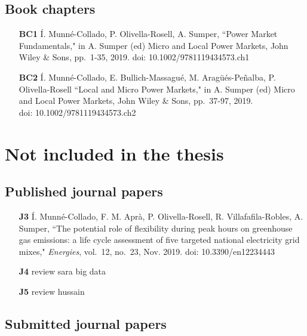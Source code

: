 \subsection*{Book chapters}

\begin{itemize}
	
	\item [\textbf{BC1}] \'{I}. Munn\'{e}-Collado, P. Olivella-Rosell, A. Sumper, ``Power Market Fundamentals," in A. Sumper (ed) Micro and Local Power Markets, John Wiley \& Sons, pp.~1-35, 2019. doi: 10.1002/9781119434573.ch1
	
	\item [\textbf{BC2}] \'{I}. Munn\'{e}-Collado, E. Bullich-Massagu\'{e}, M. Arag\"{u}\'{e}s-Pe\~{n}alba, P. Olivella-Rosell ``Local and Micro Power Markets," in A. Sumper (ed) Micro and Local Power Markets, John Wiley \& Sons, pp.~37-97, 2019. \\doi: 10.1002/9781119434573.ch2

	
\end{itemize}

\section*{Not included in the thesis}

\subsection*{Published journal papers}

\begin{itemize}
	
	\item[\textbf{J3}] \'{I}. Munn\'{e}-Collado, F. M. Apr\`{a}, P. Olivella-Rosell, R. Villafafila-Robles, A. Sumper, ``The potential role of flexibility during peak hours on greenhouse gas emissions: a life cycle assessment of five targeted national electricity grid mixes," \textit{Energies}, vol.~12, no.~23, Nov. 2019. doi: 10.3390/en12234443
	\item [\textbf{J4}] review sara big data
	\item [\textbf{J5}] review hussain
	
	
\end{itemize}

\subsection*{Submitted journal papers}


